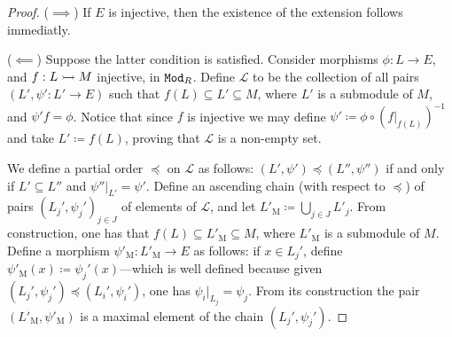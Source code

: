 \begin{proof}
    (\(\implies\)) If \(E\) is injective, then the existence of the extension
    follows immediatly.

    (\(\impliedby\)) Suppose the latter condition is satisfied. Consider morphisms
    \(\phi: L \to E\), and \(f: L \rightarrowtail M\) injective, in \({\texttt{Mod}_{R}}\). Define
    \(\mathcal{L}\) to be the collection of all pairs \((L', \psi': L' \to E)\) such
    that \(f(L) \subseteq L' \subseteq M\), where \(L'\) is a submodule of \(M\),
    and \(\psi' f = \phi\). Notice that since \(f\) is injective we may define
    \(\psi' \coloneq \phi \circ (f|_{f(L)})^{-1}\) and take \(L' \coloneq f(L)\),
    proving that \(\mathcal{L}\) is a non-empty set.

    We define a partial order \(\preceq\) on \(\mathcal{L}\) as follows:
    \((L', \psi') \preceq (L'', \psi'')\) if and only if \(L' \subseteq L''\) and
    \(\psi''|_{L'} = \psi'\). Define an ascending chain (with respect to
    \(\preceq\)) of pairs \((L_j', \psi_j')_{j \in J}\) of elements of
    \(\mathcal{L}\), and let \(L'_{\text{M}} \coloneq \bigcup_{j \in J} L'_j\). From
    construction, one has that \(f(L) \subseteq L'_{\text{M}} \subseteq M\), where
    \(L'_{\text{M}}\) is a submodule of \(M\). Define a morphism
    \(\psi'_{\text{M}}: L'_{\text{M}} \to E\) as follows: if \(x \in L_j'\), define
    \(\psi'_{\text{M}}(x) \coloneq \psi_j'(x)\)---which is well defined because
    given \((L_j', \psi_j') \preceq (L_i', \psi_i')\), one has
    \(\psi_i|_{L_j} = \psi_j\). From its construction the pair
    \((L'_{\text{M}}, \psi'_{\text{M}})\) is a maximal element of the chain
    \((L_j', \psi_j')\).


\end{proof}
